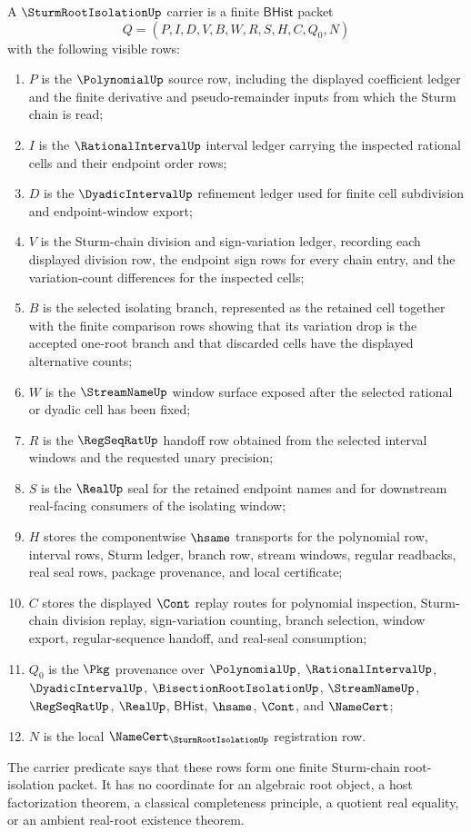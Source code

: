 \begin{definition}
\label{def:sturm-root-isolation-carrier}
A $\SturmRootIsolationUp$ carrier is a finite $\mathsf{BHist}$ packet
$$
Q=(P,I,D,V,B,W,R,S,H,C,Q_0,N)
$$
with the following visible rows:
\begin{enumerate}
\item $P$ is the $\PolynomialUp$ source row, including the displayed coefficient ledger and the finite derivative and pseudo-remainder inputs from which the Sturm chain is read;
\item $I$ is the $\RationalIntervalUp$ interval ledger carrying the inspected rational cells and their endpoint order rows;
\item $D$ is the $\DyadicIntervalUp$ refinement ledger used for finite cell subdivision and endpoint-window export;
\item $V$ is the Sturm-chain division and sign-variation ledger, recording each displayed division row, the endpoint sign rows for every chain entry, and the variation-count differences for the inspected cells;
\item $B$ is the selected isolating branch, represented as the retained cell together with the finite comparison rows showing that its variation drop is the accepted one-root branch and that discarded cells have the displayed alternative counts;
\item $W$ is the $\StreamNameUp$ window surface exposed after the selected rational or dyadic cell has been fixed;
\item $R$ is the $\RegSeqRatUp$ handoff row obtained from the selected interval windows and the requested unary precision;
\item $S$ is the $\RealUp$ seal for the retained endpoint names and for downstream real-facing consumers of the isolating window;
\item $H$ stores the componentwise $\hsame$ transports for the polynomial row, interval rows, Sturm ledger, branch row, stream windows, regular readbacks, real seal rows, package provenance, and local certificate;
\item $C$ stores the displayed $\Cont$ replay routes for polynomial inspection, Sturm-chain division replay, sign-variation counting, branch selection, window export, regular-sequence handoff, and real-seal consumption;
\item $Q_0$ is the $\Pkg$ provenance over $\PolynomialUp$, $\RationalIntervalUp$, $\DyadicIntervalUp$, $\BisectionRootIsolationUp$, $\StreamNameUp$, $\RegSeqRatUp$, $\RealUp$, $\mathsf{BHist}$, $\hsame$, $\Cont$, and $\NameCert$;
\item $N$ is the local $\NameCert_{\SturmRootIsolationUp}$ registration row.
\end{enumerate}
The carrier predicate says that these rows form one finite Sturm-chain root-isolation packet. It has no coordinate for an algebraic root object, a host factorization theorem, a classical completeness principle, a quotient real equality, or an ambient real-root existence theorem.
\end{definition}

